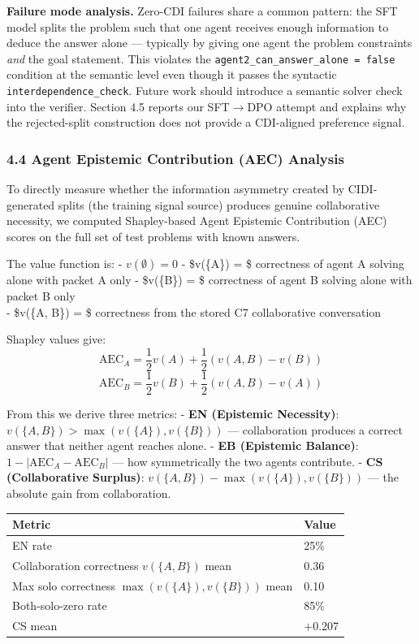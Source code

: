 \documentclass[
  11pt,
]{article}
\newcounter{none} %
\begin{document}
\textbf{Failure mode analysis.} Zero-CDI failures share a common
pattern: the SFT model splits the problem such that one agent receives
enough information to deduce the answer alone --- typically by giving
one agent the problem constraints \emph{and} the goal statement. This
violates the \texttt{agent2\_can\_answer\_alone\ =\ false} condition at
the semantic level even though it passes the syntactic
\texttt{interdependence\_check}. Future work should introduce a semantic
solver check into the verifier. Section 4.5 reports our SFT$\to$DPO attempt
and explains why the rejected-split construction does not provide a
CDI-aligned preference signal.

\subsubsection{4.4 Agent Epistemic Contribution (AEC)
Analysis}\label{agent-epistemic-contribution-aec-analysis}

To directly measure whether the information asymmetry created by
CIDI-generated splits (the training signal source) produces genuine
collaborative necessity, we computed Shapley-based Agent Epistemic
Contribution (AEC) scores on the full set of test problems with known
answers.

The value function is: - \(v(\emptyset) = 0\) - \$v(\{A\}) = \$
correctness of agent A solving alone with packet A only - \$v(\{B\}) =
\$ correctness of agent B solving alone with packet B only\\
- \$v(\{A, B\}) = \$ correctness from the stored C7 collaborative
conversation

Shapley values give:
\[\text{AEC}_A = \frac{1}{2}v(A) + \frac{1}{2}(v(A,B) - v(B))\]
\[\text{AEC}_B = \frac{1}{2}v(B) + \frac{1}{2}(v(A,B) - v(A))\]

From this we derive three metrics: - \textbf{EN (Epistemic Necessity)}:
\(v(\{A,B\}) > \max(v(\{A\}), v(\{B\}))\) --- collaboration produces a
correct answer that neither agent reaches alone. - \textbf{EB (Epistemic
Balance)}: \(1 - |\text{AEC}_A - \text{AEC}_B|\) --- how symmetrically
the two agents contribute. - \textbf{CS (Collaborative Surplus)}:
\(v(\{A,B\}) - \max(v(\{A\}), v(\{B\}))\) --- the absolute gain from
collaboration.

{\def\LTcaptype{none} %
\begin{longtable}[]{@{}ll@{}}
\toprule\noalign{}
Metric & Value \\
\midrule\noalign{}
\endhead
\bottomrule\noalign{}
\endlastfoot
EN rate & 25\% \\
Collaboration correctness \(v(\{A,B\})\) mean & 0.36 \\
Max solo correctness \(\max(v(\{A\}), v(\{B\}))\) mean & 0.10 \\
Both-solo-zero rate & 85\% \\
CS mean & +0.207 \\
\end{longtable}
}
\end{document}
